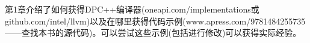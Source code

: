 

第1章介绍了如何获得DPC++编译器(oneapi.com/implementations或github.com/intel/llvm)以及在哪里获得代码示例(www.apress.com/9781484255735——查找本书的源代码)。可以尝试这些示例(包括进行修改)可以获得实际经验。\par